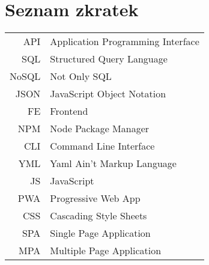 
\chapter{Seznam zkratek}

\begin{tabular}{rl}
    API & Application Programming Interface \\
    SQL & Structured Query Language \\
    NoSQL & Not Only SQL \\
    JSON & JavaScript Object Notation \\
    FE & Frontend \\
    NPM & Node Package Manager \\
    CLI & Command Line Interface \\
    YML & Yaml Ain't Markup Language \\
    JS & JavaScript \\
    PWA & Progressive Web App \\
    CSS & Cascading Style Sheets \\
    SPA & Single Page Application \\
    MPA & Multiple Page Application \\
\end{tabular}
